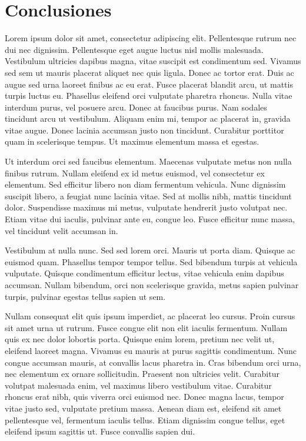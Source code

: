 
\chapter{Conclusiones}

Lorem ipsum dolor sit amet, consectetur adipiscing elit. Pellentesque rutrum nec dui nec dignissim. Pellentesque eget augue luctus nisl mollis malesuada. Vestibulum ultricies dapibus magna, vitae suscipit est condimentum sed. Vivamus sed sem ut mauris placerat aliquet nec quis ligula. Donec ac tortor erat. Duis ac augue sed urna laoreet finibus ac eu erat. Fusce placerat blandit arcu, ut mattis turpis luctus eu. Phasellus eleifend orci vulputate pharetra rhoncus. Nulla vitae interdum purus, vel posuere arcu. Donec at faucibus purus. Nam sodales tincidunt arcu ut vestibulum. Aliquam enim mi, tempor ac placerat in, gravida vitae augue. Donec lacinia accumsan justo non tincidunt. Curabitur porttitor quam in scelerisque tempus. Ut maximus elementum massa et egestas.

Ut interdum orci sed faucibus elementum. Maecenas vulputate metus non nulla finibus rutrum. Nullam eleifend ex id metus euismod, vel consectetur ex elementum. Sed efficitur libero non diam fermentum vehicula. Nunc dignissim suscipit libero, a feugiat nunc lacinia vitae. Sed at mollis nibh, mattis tincidunt dolor. Suspendisse maximus mi metus, vulputate hendrerit justo volutpat nec. Etiam vitae dui iaculis, pulvinar ante eu, congue leo. Fusce efficitur nunc massa, vel tincidunt velit accumsan in.

Vestibulum at nulla nunc. Sed sed lorem orci. Mauris ut porta diam. Quisque ac euismod quam. Phasellus tempor tempor tellus. Sed bibendum turpis at vehicula vulputate. Quisque condimentum efficitur lectus, vitae vehicula enim dapibus accumsan. Nullam bibendum, orci non scelerisque gravida, metus sapien pulvinar turpis, pulvinar egestas tellus sapien ut sem.

Nullam consequat elit quis ipsum imperdiet, ac placerat leo cursus. Proin cursus sit amet urna ut rutrum. Fusce congue elit non elit iaculis fermentum. Nullam quis ex nec dolor lobortis porta. Quisque enim lorem, pretium nec velit ut, eleifend laoreet magna. Vivamus eu mauris at purus sagittis condimentum. Nunc congue accumsan mauris, at convallis lacus pharetra in. Cras bibendum orci urna, nec elementum ex ornare sollicitudin. Praesent non ultricies velit. Curabitur volutpat malesuada enim, vel maximus libero vestibulum vitae. Curabitur rhoncus erat nibh, quis viverra orci euismod nec. Donec magna lacus, tempor vitae justo sed, vulputate pretium massa. Aenean diam est, eleifend sit amet pellentesque vel, fermentum iaculis tellus. Etiam dignissim congue tellus, eget eleifend ipsum sagittis ut. Fusce convallis sapien dui.

